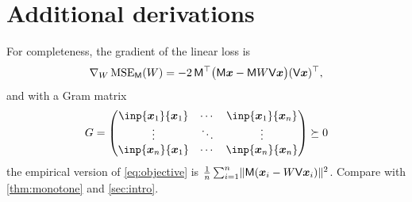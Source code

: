 \section{Additional derivations}\label{app:derivations}

For completeness, the gradient of the linear loss is
\begin{equation}\label{eq:grad}
  \nabla_W \mse[\mask]{W} = -2\,\mask^\top\bigl(\mask\vx - \mask W \vis\vx\bigr)(\vis\vx)^\top ,
\end{equation}
and with a Gram matrix
\[
  G = \begin{pmatrix}
    \inp{\vx_1}{\vx_1} & \cdots & \inp{\vx_1}{\vx_n} \\
    \vdots & \ddots & \vdots \\
    \inp{\vx_n}{\vx_1} & \cdots & \inp{\vx_n}{\vx_n}
  \end{pmatrix} \succeq 0
\]
the empirical version of \eqref{eq:objective} is $\frac{1}{n}\sum_{i=1}^{n} \norm{\mask(\vx_i - W\vis\vx_i)}^2$.
Compare with \cref{thm:monotone} and \cref{sec:intro}.
